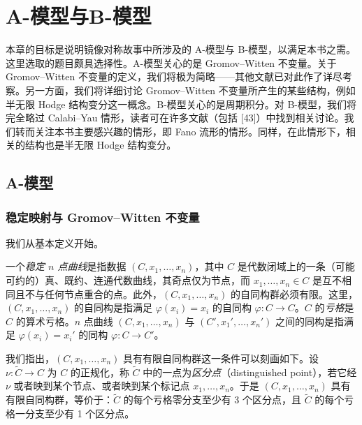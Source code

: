 \section{A-模型与B-模型}

本章的目标是说明镜像对称故事中所涉及的 A-模型与 B-模型，以满足本书之需。这里选取的题目颇具选择性。A-模型关心的是 Gromov–Witten 不变量。关于 Gromov–Witten 不变量的定义，我们将极为简略——其他文献已对此作了详尽考察。另一方面，我们将详细讨论 Gromov–Witten 不变量所产生的某些结构，例如半无限 Hodge 结构变分这一概念。B-模型关心的是周期积分。对 B-模型，我们将完全略过 Calabi–Yau 情形，读者可在许多文献（包括 [43]）中找到相关讨论。我们转而关注本书主要感兴趣的情形，即 Fano 流形的情形。同样，在此情形下，相关的结构也是半无限 Hodge 结构变分。


\subsection{A-模型}

\subsubsection{稳定映射与 Gromov–Witten 不变量}

我们从基本定义开始。

\begin{definition}
一个\emph{稳定 $n$ 点曲线}是指数据 $(C,x_1,\dots,x_n)$，其中 $C$ 是代数闭域上的一条（可能可约的）真、既约、连通代数曲线，其奇点仅为节点，而 $x_1,\dots,x_n\in C$ 是互不相同且不与任何节点重合的点。此外，$(C,x_1,\dots,x_n)$ 的自同构群必须有限。这里，$(C,x_1,\dots,x_n)$ 的自同构是指满足 $\varphi(x_i)=x_i$ 的自同构 $\varphi:C\to C$。$C$ 的\emph{亏格}是 $C$ 的算术亏格。$n$ 点曲线 $(C,x_1,\dots,x_n)$ 与 $(C',x_1',\dots,x_n')$ 之间的同构是指满足 $\varphi(x_i)=x_i'$ 的同构 $\varphi:C\to C'$。
\end{definition}

我们指出，$(C,x_1,\dots,x_n)$ 具有有限自同构群这一条件可以刻画如下。设 $\nu:\tilde C\to C$ 为 $C$ 的正规化，称 $\tilde C$ 中的一点为\emph{区分点}（distinguished point），若它经 $\nu$ 或者映到某个节点、或者映到某个标记点 $x_1,\dots,x_n$。于是 $(C,x_1,\dots,x_n)$ 具有有限自同构群，等价于：$\tilde C$ 的每个亏格零分支至少有 3 个区分点，且 $\tilde C$ 的每个亏格一分支至少有 1 个区分点。

